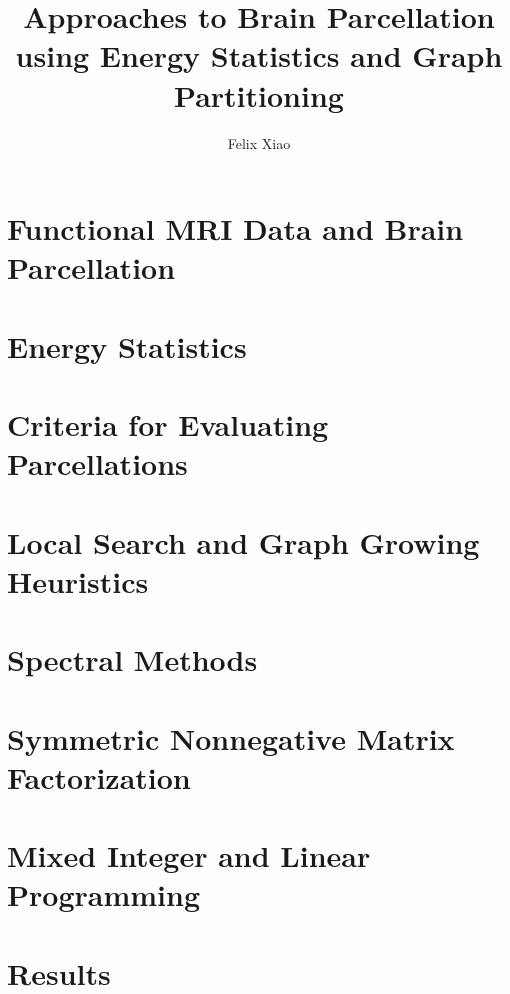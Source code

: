 \documentclass[12pt,lot,lof]{puthesis_undergraduate}
\title{Approaches to Brain Parcellation using Energy Statistics and Graph Partitioning}
\author{Felix Xiao}
\begin{document}
\chapter{Functional MRI Data and Brain Parcellation}
%

\chapter{Energy Statistics}


\chapter{Criteria for Evaluating Parcellations}


\chapter{Local Search and Graph Growing Heuristics}


\chapter{Spectral Methods}


\chapter{Symmetric Nonnegative Matrix Factorization}


\chapter{Mixed Integer and Linear Programming}


\chapter{Results}




\end{document}
